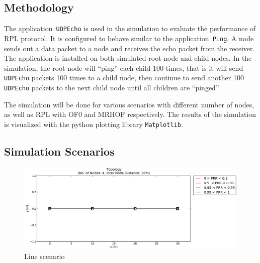 \subsection{Methodology}
\label{Sim:Method}
The application~\texttt{UDPEcho} is used in the simulation to evaluate the performance of RPL protocol. It is configured to behave similar to the application~\texttt{Ping}. A node sends out a data packet to a node and receives the echo packet from the receiver. The application is installed on both simulated root node and child nodes. In the simulation, the root node will ``ping'' each child 100 times, that is it will send \texttt{UDPEcho} packets 100 times to a child node, then continue to send another 100 \texttt{UDPEcho} packets to the next child node until all children are  ``pinged''.     
\newline

The simulation will be done for various scenarios with different number of nodes, as well as RPL with OF0 and MRHOF respectively. The results of the simulation is visualized with the python plotting library \texttt{Matplotlib}.

\subsection{Simulation Scenarios}
\label{Sim:Scenarios}
\begin{figure}[!ht]
 	\centering
    \leavevmode
      \includegraphics[scale=0.35]{Pics/results/topo4_dist10_line.pdf}
    \caption{Line scenario}
    \label{fig:scenario_line}
\end{figure}

